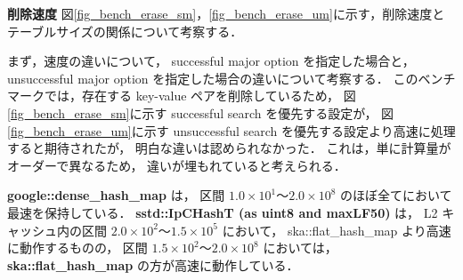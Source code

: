 %
{\bf 削除速度}
\samepage\newline\indent
図\ref{fig_bench_erase_sm}，\ref{fig_bench_erase_um}に示す，削除速度とテーブルサイズの関係について考察する．

まず，速度の違いについて，
successful major option を指定した場合と，
unsuccessful major option を指定した場合の違いについて考察する．
このベンチマークでは，存在する key-value ペアを削除しているため，
図\ref{fig_bench_erase_sm}に示す successful search を優先する設定が，
図\ref{fig_bench_erase_um}に示す unsuccessful search を優先する設定より高速に処理すると期待されたが，
明白な違いは認められなかった．
これは，単に計算量がオーダーで異なるため，
違いが埋もれていると考えられる．

{\bf google::dense\_hash\_map} は，
区間 $1.0\times10^1〜2.0\times10^8$ のほぼ全てにおいて最速を保持している．
{\bf sstd::IpCHashT (as uint8 and maxLF50)} は，
L2 キャッシュ内の区間 $2.0\times10^2〜1.5\times10^5$ において，
ska::flat\_hash\_map より高速に動作するものの，
区間 $1.5\times10^2〜2.0\times10^8$ においては，
{\bf ska::flat\_hash\_map} の方が高速に動作している．



